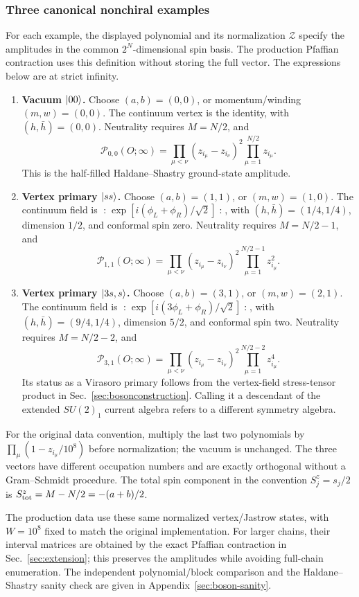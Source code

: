 \subsubsection{Three canonical nonchiral examples}
For each example, the displayed polynomial and its normalization
$\mathcal Z$ specify the amplitudes in the common $2^N$-dimensional spin
basis. The production Pfaffian contraction uses this definition without
storing the full vector. The expressions below are at strict infinity.
\begin{enumerate}
\item \textbf{Vacuum $\lvert 00\rangle$.}
Choose $(a,b)=(0,0)$, or momentum/winding $(m,w)=(0,0)$.
The continuum vertex is the identity, with $(h,\bar h)=(0,0)$.
Neutrality requires $M=N/2$, and
\begin{equation}
 \mathcal P_{0,0}(O;\infty)=
 \prod_{\mu<\nu}(z_{i_\mu}-z_{i_\nu})^2\prod_{\mu=1}^{N/2}z_{i_\mu}.
\end{equation}
This is the half-filled Haldane--Shastry ground-state amplitude.
\item \textbf{Vertex primary $\lvert ss\rangle$.}
Choose $(a,b)=(1,1)$, or $(m,w)=(1,0)$. The continuum field is
$\mathopen{:}\exp[i(\phi_L+\phi_R)/\sqrt2]\mathclose{:}$, with
$(h,\bar h)=(1/4,1/4)$, dimension $1/2$, and conformal spin zero.
Neutrality requires $M=N/2-1$, and
\begin{equation}
 \mathcal P_{1,1}(O;\infty)=
 \prod_{\mu<\nu}(z_{i_\mu}-z_{i_\nu})^2
 \prod_{\mu=1}^{N/2-1}z_{i_\mu}^{2}.
\end{equation}
\item \textbf{Vertex primary $\lvert 3s,s\rangle$.}
Choose $(a,b)=(3,1)$, or $(m,w)=(2,1)$. The continuum field is
$\mathopen{:}\exp[i(3\phi_L+\phi_R)/\sqrt2]\mathclose{:}$, with
$(h,\bar h)=(9/4,1/4)$, dimension $5/2$, and conformal spin two.
Neutrality requires $M=N/2-2$, and
\begin{equation}
 \mathcal P_{3,1}(O;\infty)=
 \prod_{\mu<\nu}(z_{i_\mu}-z_{i_\nu})^2
 \prod_{\mu=1}^{N/2-2}z_{i_\mu}^{4}.
\end{equation}
Its status as a Virasoro primary follows from the vertex-field
stress-tensor product in Sec.~\ref{sec:bosonconstruction}. Calling it a descendant of the extended
$SU(2)_1$ current algebra refers to a different symmetry algebra.
\end{enumerate}
For the original data convention, multiply the last two polynomials by
$\prod_{\mu}(1-z_{i_\mu}/10^8)$ before normalization; the vacuum is
unchanged. The three vectors have different occupation numbers and
are exactly orthogonal without a Gram--Schmidt procedure. The total
spin component in the convention $S_j^z=s_j/2$ is
$S^z_{\rm tot}=M-N/2=-(a+b)/2$.

The production data use these same normalized vertex/Jastrow states,
with $W=10^8$ fixed to match the original implementation. For larger
chains, their interval matrices are obtained by the exact Pfaffian
contraction in Sec.~\ref{sec:extension}; this preserves the amplitudes
while avoiding full-chain enumeration. The independent polynomial/block
comparison and the Haldane--Shastry sanity check are given in
Appendix~\ref{sec:boson-sanity}.
